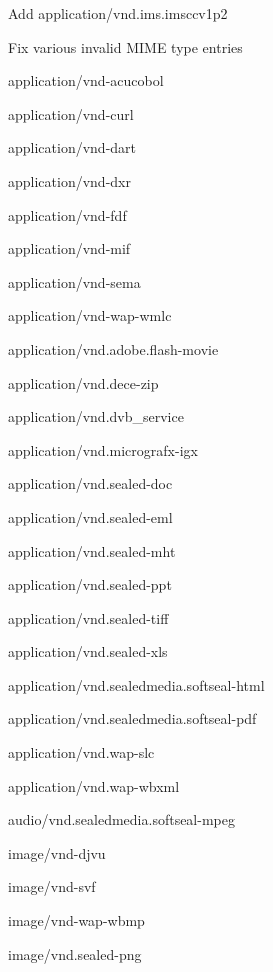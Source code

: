 \begin{DoxyItemize}
\item Add {\ttfamily application/vnd.\+ims.\+imsccv1p2}
\item Fix various invalid M\+I\+ME type entries
\begin{DoxyItemize}
\item {\ttfamily application/vnd-\/acucobol}
\item {\ttfamily application/vnd-\/curl}
\item {\ttfamily application/vnd-\/dart}
\item {\ttfamily application/vnd-\/dxr}
\item {\ttfamily application/vnd-\/fdf}
\item {\ttfamily application/vnd-\/mif}
\item {\ttfamily application/vnd-\/sema}
\item {\ttfamily application/vnd-\/wap-\/wmlc}
\item {\ttfamily application/vnd.\+adobe.\+flash-\/movie}
\item {\ttfamily application/vnd.\+dece-\/zip}
\item {\ttfamily application/vnd.\+dvb\+\_\+service}
\item {\ttfamily application/vnd.\+micrografx-\/igx}
\item {\ttfamily application/vnd.\+sealed-\/doc}
\item {\ttfamily application/vnd.\+sealed-\/eml}
\item {\ttfamily application/vnd.\+sealed-\/mht}
\item {\ttfamily application/vnd.\+sealed-\/ppt}
\item {\ttfamily application/vnd.\+sealed-\/tiff}
\item {\ttfamily application/vnd.\+sealed-\/xls}
\item {\ttfamily application/vnd.\+sealedmedia.\+softseal-\/html}
\item {\ttfamily application/vnd.\+sealedmedia.\+softseal-\/pdf}
\item {\ttfamily application/vnd.\+wap-\/slc}
\item {\ttfamily application/vnd.\+wap-\/wbxml}
\item {\ttfamily audio/vnd.\+sealedmedia.\+softseal-\/mpeg}
\item {\ttfamily image/vnd-\/djvu}
\item {\ttfamily image/vnd-\/svf}
\item {\ttfamily image/vnd-\/wap-\/wbmp}
\item {\ttfamily image/vnd.\+sealed-\/png}

\end{DoxyItemize}
\end{DoxyItemize}

